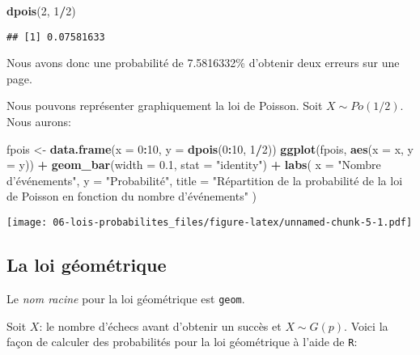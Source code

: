 \documentclass[]{book}
\newenvironment{Shaded}{\begin{snugshade}}{\end{snugshade}}
\newcommand{\KeywordTok}[1]{\textcolor[rgb]{0.13,0.29,0.53}{\textbf{#1}}}
\newcommand{\DataTypeTok}[1]{\textcolor[rgb]{0.13,0.29,0.53}{#1}}
\newcommand{\DecValTok}[1]{\textcolor[rgb]{0.00,0.00,0.81}{#1}}
\newcommand{\FloatTok}[1]{\textcolor[rgb]{0.00,0.00,0.81}{#1}}
\newcommand{\StringTok}[1]{\textcolor[rgb]{0.31,0.60,0.02}{#1}}
\newcommand{\OperatorTok}[1]{\textcolor[rgb]{0.81,0.36,0.00}{\textbf{#1}}}
\newcommand{\NormalTok}[1]{#1}
\begin{document}
\begin{Shaded}
\begin{Highlighting}[]
\KeywordTok{dpois}\NormalTok{(}\DecValTok{2}\NormalTok{, }\DecValTok{1}\OperatorTok{/}\DecValTok{2}\NormalTok{)}
\end{Highlighting}
\end{Shaded}

\begin{verbatim}
## [1] 0.07581633
\end{verbatim}

Nous avons donc une probabilité de 7.5816332\% d'obtenir deux erreurs
sur une page.

Nous pouvons représenter graphiquement la loi de Poisson. Soit
\(X\sim Po(1/2)\). Nous aurons:

\begin{Shaded}
\begin{Highlighting}[]
\NormalTok{fpois <-}\StringTok{ }\KeywordTok{data.frame}\NormalTok{(}\DataTypeTok{x =} \DecValTok{0}\OperatorTok{:}\DecValTok{10}\NormalTok{, }\DataTypeTok{y =} \KeywordTok{dpois}\NormalTok{(}\DecValTok{0}\OperatorTok{:}\DecValTok{10}\NormalTok{, }\DecValTok{1}\OperatorTok{/}\DecValTok{2}\NormalTok{))}
\KeywordTok{ggplot}\NormalTok{(fpois, }\KeywordTok{aes}\NormalTok{(}\DataTypeTok{x =}\NormalTok{ x, }\DataTypeTok{y =}\NormalTok{ y)) }\OperatorTok{+}
\StringTok{  }\KeywordTok{geom_bar}\NormalTok{(}\DataTypeTok{width =} \FloatTok{0.1}\NormalTok{, }\DataTypeTok{stat =} \StringTok{"identity"}\NormalTok{) }\OperatorTok{+}
\StringTok{  }\KeywordTok{labs}\NormalTok{(}
    \DataTypeTok{x =} \StringTok{"Nombre d'événements"}\NormalTok{,}
    \DataTypeTok{y =} \StringTok{"Probabilité"}\NormalTok{,}
    \DataTypeTok{title =} \StringTok{"Répartition de la probabilité de la loi de Poisson en fonction du nombre d'événements"}
\NormalTok{  )}
\end{Highlighting}
\end{Shaded}

\texttt{[image: 06-lois-probabilites\_files/figure-latex/unnamed-chunk-5-1.pdf]}

\subsection{La loi géométrique}\label{la-loi-geometrique}

Le \emph{nom racine} pour la loi géométrique est \texttt{geom}.

Soit \(X\): le nombre d'échecs avant d'obtenir un succès et
\(X\sim G(p)\). Voici la façon de calculer des probabilités pour la loi
géométrique à l'aide de \texttt{R}:
\end{document}
